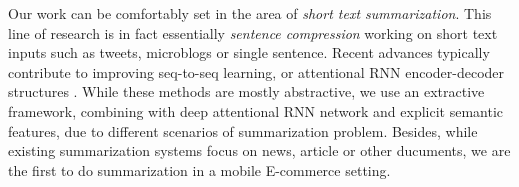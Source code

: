 Our work can be comfortably set in the area 
of \textit{short text summarization}. 
This line of research is in fact essentially \textit{sentence compression}
working on short text inputs such as tweets, microblogs or single sentence. 
Recent advances typically contribute to improving seq-to-seq learning, 
or attentional RNN encoder-decoder structures \cite{chopra2016abstractive,nallapati2016abstractive}.
While these methods are mostly abstractive, 
we use an extractive framework,
combining with deep attentional RNN network and explicit semantic features, due to different scenarios of summarization problem.
Besides, while existing summarization systems focus on 
news, article or other ducuments, 
we are the first to do summarization in a mobile E-commerce setting.
 
